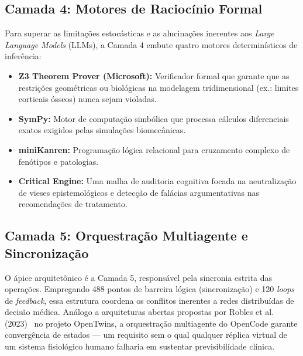 \subsection{Camada 4: Motores de Raciocínio Formal}
Para superar as limitações estocásticas e as alucinações inerentes aos \textit{Large Language Models} (LLMs), a Camada 4 embute quatro motores determinísticos de inferência:
\begin{itemize}
    \item \textbf{Z3 Theorem Prover (Microsoft):} Verificador formal que garante que as restrições geométricas ou biológicas na modelagem tridimensional (ex.: limites corticais ósseos) nunca sejam violadas.
    \item \textbf{SymPy:} Motor de computação simbólica que processa cálculos diferenciais exatos exigidos pelas simulações biomecânicas.
    \item \textbf{miniKanren:} Programação lógica relacional para cruzamento complexo de fenótipos e patologias.
    \item \textbf{Critical Engine:} Uma malha de auditoria cognitiva focada na neutralização de vieses epistemológicos e detecção de falácias argumentativas nas recomendações de tratamento.
\end{itemize}

\subsection{Camada 5: Orquestração Multiagente e Sincronização}
O ápice arquitetônico é a Camada 5, responsável pela sincronia estrita das operações. Empregando 488 pontos de barreira lógica (sincronização) e 120 \textit{loops} de \textit{feedback}, essa estrutura coordena os conflitos inerentes a redes distribuídas de decisão médica. Análogo a arquiteturas abertas propostas por Robles et al. (2023)~\cite{Robles2023} no projeto OpenTwins, a orquestração multiagente do OpenCode garante convergência de estados — um requisito sem o qual qualquer réplica virtual de um sistema fisiológico humano falharia em sustentar previsibilidade clínica.
